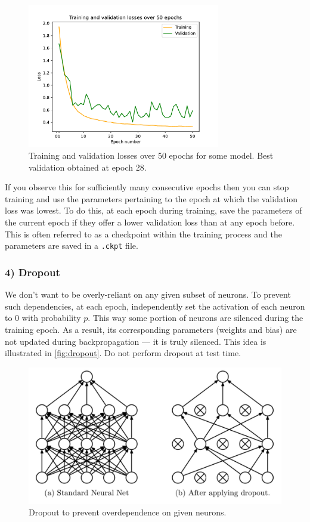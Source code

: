 \documentclass[11pt]{article}
\begin{document}
\begin{figure}[t]
    \centering
    \includegraphics[width=0.75\textwidth]{./figures/neural_nets/REG_early_stopping.pdf}
    \caption{Training and validation losses over 50 epochs for some model. Best validation obtained at epoch 28.}
    \label{fig:early_stopping}
\end{figure}

If you observe this for sufficiently many consecutive epochs then you can stop training and use the parameters pertaining to the epoch at which the validation loss was lowest. To do this, at each epoch during training, save the parameters of the current epoch if they offer a lower validation loss than at any epoch before. This is often referred to as a checkpoint within the training process and the parameters are saved in a \texttt{.ckpt} file.

\subsubsection*{4) Dropout} We don't want to be overly-reliant on any given subset of neurons. To prevent such dependencies, at each epoch, independently set the activation of each neuron to 0 with probability $p$. This way some portion of neurons are silenced during the training epoch. As a result, its corresponding parameters (weights and bias) are not updated during backpropagation — it is truly silenced. This idea is illustrated in \autoref{fig:dropout}. Do not perform dropout at test time.

\begin{figure}[t]
    \centering
    \includegraphics[width=\textwidth]{./figures/neural_nets/REG_dropout.png}
    \caption{Dropout to prevent overdependence on given neurons. }
    \label{fig:dropout}
\end{figure}
\end{document}
